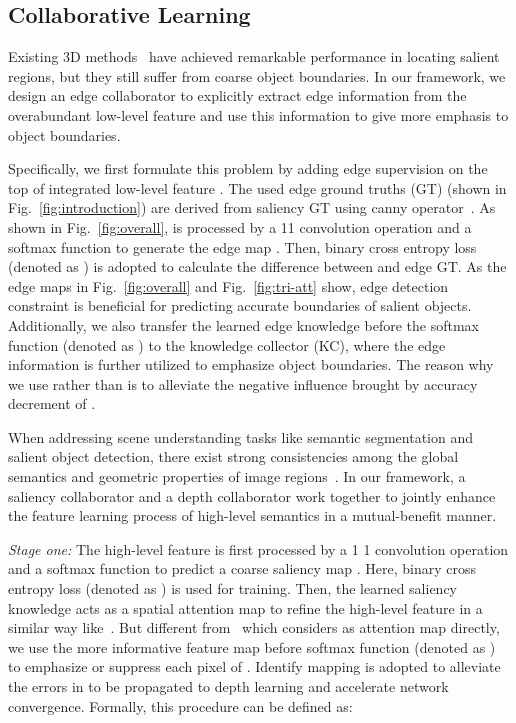 \documentclass[runningheads]{llncs}
\begin{document}
\subsection{Collaborative Learning}
\label{subsection:3.3}
Existing 3D methods~\cite{3DDF,3DPCA,3DTANet,3DDMRA,3DCPFP} have achieved remarkable performance in locating salient regions, but they still suffer from coarse object boundaries.
In our framework, we design an edge collaborator to explicitly extract edge information from the overabundant low-level feature and use this information to give more emphasis to object boundaries.


Specifically, we first formulate this problem by adding edge supervision on the top of integrated low-level feature .
The used edge ground truths (GT) (shown in Fig.~\ref{fig:introduction}) are derived from saliency GT using canny operator~\cite{Canny}.
As shown in Fig.~\ref{fig:overall},  is processed by a 11 convolution operation and a softmax function to generate the edge map .
Then, binary cross entropy loss (denoted as ) is adopted to calculate the difference between  and edge GT.
As the edge maps  in Fig.~\ref{fig:overall} and Fig.~\ref{fig:tri-att} show,
edge detection constraint is beneficial for predicting accurate boundaries of salient objects.
Additionally, we also transfer the learned edge knowledge before the softmax function (denoted as ) to the knowledge collector (KC), where the edge information is further utilized to emphasize object boundaries.
The reason why we use  rather than  is to alleviate the negative influence brought by accuracy decrement of .





When addressing scene understanding tasks like semantic segmentation and salient object detection, there exist strong consistencies among the global semantics and geometric properties of image regions~\cite{Towards}.
In our framework, a saliency collaborator and a depth collaborator work together to jointly enhance the feature learning process of high-level semantics in a mutual-benefit manner.



\emph{ Stage one:}
The high-level feature  is first processed by a 1  1 convolution operation and a softmax function to predict a coarse saliency map .
Here, binary cross entropy loss (denoted as ) is used for training.
Then, the learned saliency knowledge acts as a spatial attention map to refine the high-level feature in a similar way like~\cite{2DCPD}.
But different from~\cite{2DCPD} which considers  as attention map directly, we use the more informative feature map before softmax function (denoted as ) to emphasize or suppress each pixel of  .
Identify mapping is adopted to alleviate the errors in  to be propagated to depth learning and accelerate network convergence.
Formally, this procedure can be defined as:
\end{document}
